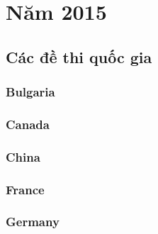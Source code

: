 \documentclass[../the-book.tex]{subfiles}
\begin{document}
\chapter{Năm 2015}

\section{Các đề thi quốc gia}

\subsection*{Bulgaria}






\subsection*{Canada}





\subsection*{China}


















\subsection*{France}









\subsection*{Germany}
\end{document}
